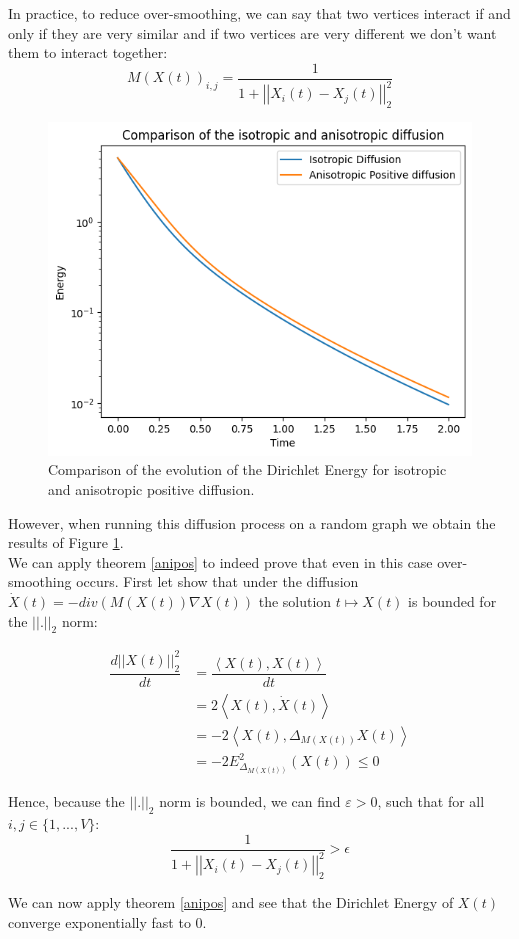 \documentclass[12pt]{article}
\begin{document}
In practice, to reduce over-smoothing, we can say that two vertices interact if and only if they are very similar and if two vertices are very different we don't want them to interact together:
$$
M(X(t))_{i,j} = \dfrac{1}{1 + \left| \left | X_i(t) - X_j(t) \right| \right|_2^2}
$$

\begin{figure}
\centering
\includegraphics[width=0.7\linewidth]{images/isovsani.png}
\caption{Comparison of the evolution of the Dirichlet Energy for isotropic and anisotropic positive diffusion.}
\label{fig:isovsani}
\end{figure}

However, when running this diffusion process on a random graph we obtain the results of Figure \ref{fig:isovsani}.\\

We can apply theorem \ref{anipos} to indeed prove that even in this case over-smoothing occurs. First let show that under the diffusion $\dot{X}(t) = - div(M(X(t))\nabla X(t))$ the solution $t \mapsto X(t)$ is bounded for the $\left| \left| . \right| \right|_2$ norm:

\begin{align*}
    \dfrac{d \left| \left| X(t) \right| \right|_2^2 }{dt} &= \dfrac{\left<X(t),X(t)\right>}{dt} \\
    &= 2 \left<X(t),\dot{X}(t)\right> \\
    &= -2 \left<X(t),\Delta_{M(X(t))}X(t)\right> \\
    &= -2 E^2_{\Delta_{M(X(t))}}(X(t))
    \leq 0
\end{align*}

Hence, because the $\left| \left| . \right| \right|_2$ norm is bounded, we can find $\varepsilon > 0$, such that for all $i,j \in \{1,...,V\}$:
$$
\dfrac{1}{1 + \left| \left | X_i(t) - X_j(t) \right| \right|_2^2} > \epsilon
$$

We can now apply theorem \ref{anipos} and see that the Dirichlet Energy of $X(t)$ converge exponentially fast to $0$.\\

\newpage
\printbibliography
\end{document}
